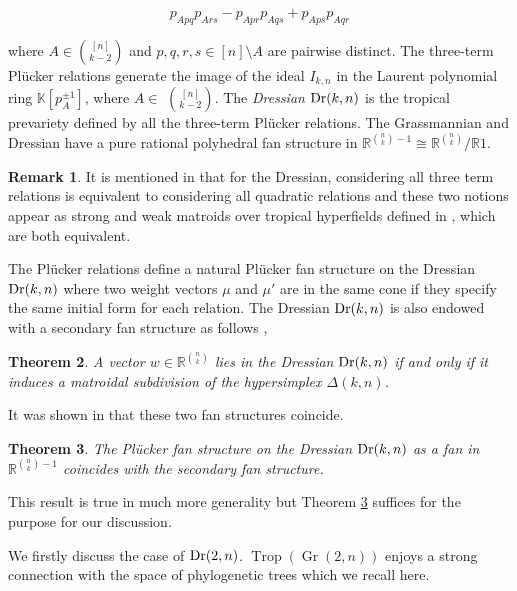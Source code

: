 \documentclass[12pt]{article}
\DeclareMathOperator{\Dr}{\rm Dr}
\DeclareMathOperator{\Trop}{Trop}
\theoremstyle{plain}
\newtheorem{theorem}{Theorem}
\theoremstyle{definition}
\newtheorem{remark}[theorem]{Remark}
\numberwithin{subcase}{case}
\DeclareMathOperator{\Gr}{Gr}
\begin{document}
\[ p_{Apq}p_{Ars} - p_{Apr}p_{Aqs} + p_{Aps}p_{Aqr}\]


where $A \in \binom{[n]}{k-2}$ and $p,q,r,s \in [n] \setminus A$ are pairwise distinct. The three-term Pl\"ucker relations generate the image of the ideal $I_{k,n}$ in the Laurent polynomial ring $\mathbb{K}[p_{A}^{\pm 1}]$, where  $A \in $ $\binom{[n]}{k-2}$. The \emph{Dressian} $\Dr(k,n)$ is the tropical prevariety defined by all the three-term Pl\"ucker relations. The Grassmannian and Dressian have a pure rational polyhedral fan structure in $\mathbb{R}^{{\binom{n}{k}} - 1 } \cong  \mathbb{R}^{\binom{n}{k}} / \mathbb{R}1$.

\begin{remark}
It is mentioned in \cite[Remark 12]{olarte2019local} that for the Dressian, considering all three term relations is equivalent to considering all quadratic relations and these two notions appear as strong and weak matroids over tropical hyperfields defined in \cite{baker2019matroids}, which are both equivalent.
\end{remark}

The Pl\"ucker relations define a natural Pl\"ucker fan structure on the Dressian $\Dr(k, n)$ where two weight vectors $\mu$ and $\mu'$ are in the same cone if they specify the same initial form for each relation. The Dressian $\Dr(k,n)$ is also endowed with a secondary fan structure as follows \cite{speyer2008linear_spaces},

\begin{theorem}
A vector $w \in \mathbb{R}^{ \binom{n}{k} }$ lies in the Dressian
$\Dr(k, n)$ if and only if it induces a matroidal subdivision of the hypersimplex $\Delta(k, n)$. 
\end{theorem}

It was shown in \cite{olarte2019local} that these two fan structures coincide.

\begin{theorem}\label{thm:coincide}
The Plücker fan structure on the Dressian $\Dr(k, n)$ as a fan in $\mathbb{R}^{{\binom{n}{k}} - 1 }$ coincides with the secondary fan structure.
\end{theorem}

This result is true in much more generality but Theorem \ref{thm:coincide} suffices for the purpose for our discussion.

We firstly discuss the case of $\Dr(2,n)$. $\Trop(\Gr(2,n))$ enjoys a strong connection with the space of phylogenetic trees which we recall here.
\end{document}

